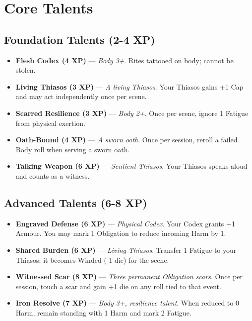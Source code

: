 \documentclass[9pt,a5paper]{extbook}
\begin{document}
\section{Core Talents}

\subsection*{Foundation Talents (2-4 XP)}
\begin{itemize}
    \item \textbf{Flesh Codex (4 XP)} --- \textit{Body 3+}. Rites tattooed on body; cannot be stolen.
    \item \textbf{Living Thiasos (3 XP)} --- \textit{A living Thiasos}. Your Thiasos gains +1 Cap and may act independently once per scene.
    \item \textbf{Scarred Resilience (3 XP)} --- \textit{Body 2+}. Once per scene, ignore 1 Fatigue from physical exertion.
    \item \textbf{Oath-Bound (4 XP)} --- \textit{A sworn oath}. Once per session, reroll a failed Body roll when serving a sworn oath.
    \item \textbf{Talking Weapon (6 XP)} --- \textit{Sentient Thiasos}. Your Thiasos speaks aloud and counts as a witness.
\end{itemize}

\subsection*{Advanced Talents (6-8 XP)}
\begin{itemize}
    \item \textbf{Engraved Defense (6 XP)} --- \textit{Physical Codex}. Your Codex grants +1 Armour. You may mark 1 Obligation to reduce incoming Harm by 1.
    \item \textbf{Shared Burden (6 XP)} --- \textit{Living Thiasos}. Transfer 1 Fatigue to your Thiasos; it becomes Winded (-1 die) for the scene.
    \item \textbf{Witnessed Scar (8 XP)} --- \textit{Three permanent Obligation scars}. Once per session, touch a scar and gain +1 die on any roll tied to that event.
    \item \textbf{Iron Resolve (7 XP)} --- \textit{Body 3+, resilience talent}. When reduced to 0 Harm, remain standing with 1 Harm and mark 2 Fatigue.
\end{itemize}
\end{document}
